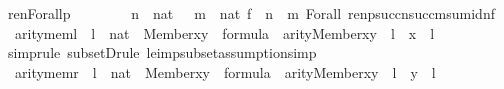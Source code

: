 \begin{isabellebody}
\isanewline
{\isachardoublequoteopen}ren{\isacharparenleft}{\kern0pt}Forall{\isacharparenleft}{\kern0pt}p{\isacharparenright}{\kern0pt}{\isacharparenright}{\kern0pt}\ {\isacharequal}{\kern0pt}\isanewline
\ \ \ \ \ \ {\isacharparenleft}{\kern0pt}{\isasymlambda}\ n\ {\isasymin}\ nat\ {\isachardot}{\kern0pt}\ {\isasymlambda}\ m\ {\isasymin}\ nat{\isachardot}{\kern0pt}\ {\isasymlambda}f\ {\isasymin}\ n\ {\isasymrightarrow}\ m{\isachardot}{\kern0pt}\ Forall\ {\isacharparenleft}{\kern0pt}ren{\isacharparenleft}{\kern0pt}p{\isacharparenright}{\kern0pt}{\isacharbackquote}{\kern0pt}succ{\isacharparenleft}{\kern0pt}n{\isacharparenright}{\kern0pt}{\isacharbackquote}{\kern0pt}succ{\isacharparenleft}{\kern0pt}m{\isacharparenright}{\kern0pt}{\isacharbackquote}{\kern0pt}sum{\isacharunderscore}{\kern0pt}id{\isacharparenleft}{\kern0pt}n{\isacharcomma}{\kern0pt}f{\isacharparenright}{\kern0pt}{\isacharparenright}{\kern0pt}{\isacharparenright}{\kern0pt}{\isachardoublequoteclose}\isanewline
\isanewline
{}\isamarkupfalse%
\ arity{\isacharunderscore}{\kern0pt}meml\ {\isacharcolon}{\kern0pt}\ {\isachardoublequoteopen}l\ {\isasymin}\ nat\ {\isasymLongrightarrow}\ Member{\isacharparenleft}{\kern0pt}x{\isacharcomma}{\kern0pt}y{\isacharparenright}{\kern0pt}\ {\isasymin}\ formula\ {\isasymLongrightarrow}\ arity{\isacharparenleft}{\kern0pt}Member{\isacharparenleft}{\kern0pt}x{\isacharcomma}{\kern0pt}y{\isacharparenright}{\kern0pt}{\isacharparenright}{\kern0pt}\ {\isasymle}\ l\ {\isasymLongrightarrow}\ x\ {\isasymin}\ l{\isachardoublequoteclose}\isanewline
%
\isadelimproof
\ \ %
\endisadelimproof
%
\isatagproof
{}\isamarkupfalse%
{\isacharparenleft}{\kern0pt}simp{\isacharcomma}{\kern0pt}rule\ subsetD{\isacharcomma}{\kern0pt}rule\ le{\isacharunderscore}{\kern0pt}imp{\isacharunderscore}{\kern0pt}subset{\isacharcomma}{\kern0pt}assumption{\isacharcomma}{\kern0pt}simp{\isacharparenright}{\kern0pt}%
\endisatagproof
{\isafoldproof}%
%
\isadelimproof
\isanewline
%
\endisadelimproof
{}\isamarkupfalse%
\ arity{\isacharunderscore}{\kern0pt}memr\ {\isacharcolon}{\kern0pt}\ {\isachardoublequoteopen}l\ {\isasymin}\ nat\ {\isasymLongrightarrow}\ Member{\isacharparenleft}{\kern0pt}x{\isacharcomma}{\kern0pt}y{\isacharparenright}{\kern0pt}\ {\isasymin}\ formula\ {\isasymLongrightarrow}\ arity{\isacharparenleft}{\kern0pt}Member{\isacharparenleft}{\kern0pt}x{\isacharcomma}{\kern0pt}y{\isacharparenright}{\kern0pt}{\isacharparenright}{\kern0pt}\ {\isasymle}\ l\ {\isasymLongrightarrow}\ y\ {\isasymin}\ l{\isachardoublequoteclose}\isanewline
%
\isadelimproof
\ \ %

\end{isabellebody}
